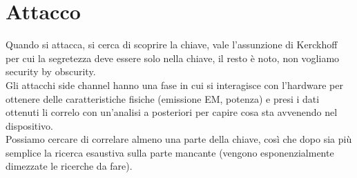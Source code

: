 \documentclass[oneside, 12pt]{extbook}
\begin{document}
\section{Attacco}
Quando si attacca, si cerca di scoprire la chiave, vale l'assunzione di Kerckhoff per cui la segretezza deve essere solo nella chiave, il resto è noto, non vogliamo security by obscurity.\\Gli attacchi side channel hanno una fase in cui si interagisce con l'hardware per ottenere delle caratteristiche fisiche (emissione EM, potenza) e presi i dati ottenuti li correlo con un'analisi a posteriori per capire cosa sta avvenendo nel dispositivo.\\Possiamo cercare di correlare almeno una parte della chiave, così che dopo sia più semplice la ricerca esaustiva sulla parte mancante (vengono esponenzialmente dimezzate le ricerche da fare).
\end{document}
